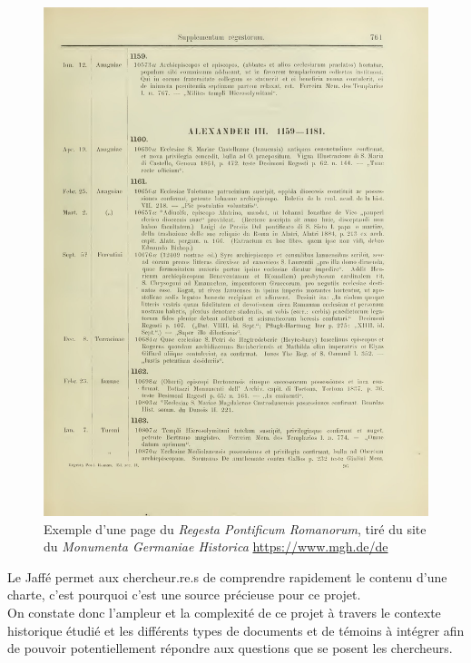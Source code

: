 \begin{figure}[H]
    \centering
    \includegraphics[width=12cm]{images/jaffe2_00772.jpg}
    \caption{Exemple d'une page du \textit{Regesta Pontificum Romanorum}, tiré du site du \textit{Monumenta Germaniae Historica} \url{https://www.mgh.de/de}}
    \label{fig:RIonline}
\end{figure}

Le Jaffé permet aux chercheur.re.s de comprendre rapidement le contenu d'une charte, c'est pourquoi c'est une source précieuse pour ce projet.\\

On constate donc l’ampleur et la complexité de ce projet à travers le contexte historique étudié et les différents types de documents et de témoins à intégrer afin de pouvoir potentiellement répondre aux questions que se posent les chercheurs. 

 
    

